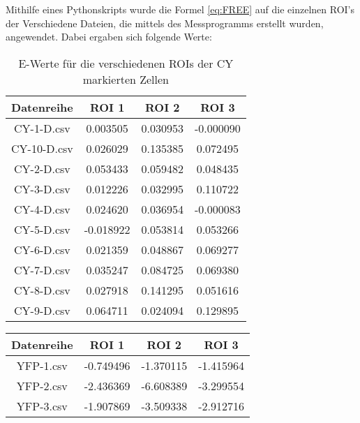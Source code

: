 Mithilfe eines Pythonskripts wurde die Formel \ref{eq:FREE} auf die einzelnen ROI's der Verschiedene Dateien, die mittels des Messprogramms erstellt wurden, angewendet. Dabei ergaben sich folgende Werte: 
\begin{table}[h]
    \centering
    \begin{tabular}{c|c|c|c}
          Datenreihe &     ROI 1 &     ROI 2 &     ROI 3 \\\hline\hline
          CY-1-D.csv &  0.003505 &  0.030953 & -0.000090 \\\hline
          CY-10-D.csv &  0.026029 &  0.135385 &  0.072495 \\\hline
           CY-2-D.csv &  0.053433 &  0.059482 &  0.048435 \\\hline
           CY-3-D.csv &  0.012226 &  0.032995 &  0.110722 \\\hline
           CY-4-D.csv &  0.024620 &  0.036954 & -0.000083 \\\hline
           CY-5-D.csv & -0.018922 &  0.053814 &  0.053266 \\\hline
           CY-6-D.csv &  0.021359 &  0.048867 &  0.069277 \\\hline
           CY-7-D.csv &  0.035247 &  0.084725 &  0.069380 \\\hline
           CY-8-D.csv &  0.027918 &  0.141295 &  0.051616 \\\hline
           CY-9-D.csv &  0.064711 &  0.024094 &  0.129895 \\\hline
        \end{tabular}
        \caption{E-Werte für die verschiedenen ROIs der CY markierten Zellen}
\end{table}

\begin{table}[h]
    \begin{tabular}{c|c|c|c}
        Datenreihe &     ROI 1 &     ROI 2 &     ROI 3 \\\hline\hline
         YFP-1.csv & -0.749496 & -1.370115 & -1.415964 \\\hline
         YFP-2.csv & -2.436369 & -6.608389 & -3.299554 \\\hline
         YFP-3.csv & -1.907869 & -3.509338 & -2.912716 \\\hline
        \end{tabular}
\end{table}
